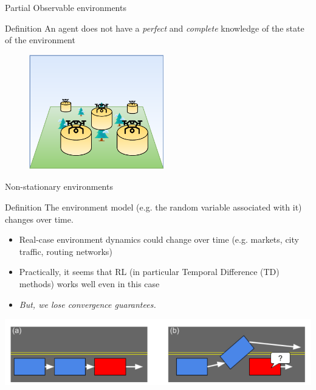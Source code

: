 \documentclass[presentation, 8pt]{beamer}\mode<presentation>{\usetheme{AMSBolognaFC}}
\begin{document}
\begin{frame}{Partial Observable environments}
	\begin{alertblock}{Definition}
		An agent does not have a \emph{perfect} and \emph{complete} knowledge of the state of the environment
	\end{alertblock}

	\begin{figure}
		\includegraphics[height=5cm]{img/challenge-partial-observable.pdf}
	\end{figure}
\end{frame}
\begin{frame}[c]{Non-stationary environments}
	\begin{alertblock}{Definition}
		The environment model (e.g. the random variable associated with it) changes
		over time.
	\end{alertblock}
	\begin{exampleblock}{}
		\begin{itemize}
			\item Real-case environment dynamics could change over time (e.g. markets, city traffic, routing networks)
			\item Practically, it seems that RL (in particular Temporal Difference (TD) methods) works well even in this case
			\item \emph{But, we lose convergence guarantees.}
		\end{itemize}
	\end{exampleblock}
%
\includegraphics[width=\textwidth]{img/non-stationary.png}
\end{frame}
\end{document}

